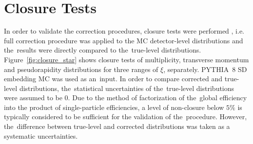 \section{Closure Tests}\label{section:star_closure}
In order to  validate the correction procedures, 
closure tests were performed , i.e. full correction procedure was applied to the MC detector-level distributions and the~results were directly compared to the~true-level distributions. Figure~\ref{fig:closure_star} shows closure tests of multiplicity, transverse momentum and pseudorapidity distributions for three ranges of $\xi$, separately.  PYTHIA~8 SD embedding \ac{MC} was used as an~input. In order  to compare  corrected and true-level distributions, the~statistical uncertainties of the~true-level distributions were assumed to be $0$. Due to the method of factorization of the~global efficiency into the product of single-particle efficiencies, a level of non-closure below $5\%$ is typically considered to be sufficient for the validation of the~procedure. However, the~difference between true-level and corrected distributions was taken as a systematic uncertainties.

